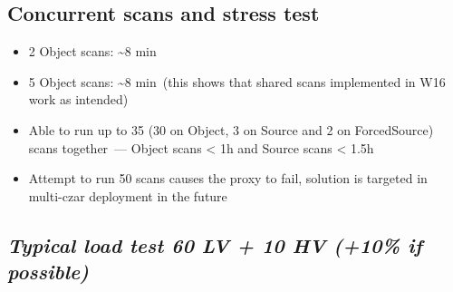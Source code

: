 \documentclass[DM,toc]{lsstdoc}
\begin{document}
\subsection{\texorpdfstring{\textbf{Concurrent scans and stress
test}}{Concurrent scans and stress test}}\label{concurrent-scans-and-stress-test}

\begin{itemize}
\item
  2 Object scans: \textasciitilde{}8 min
\item
  5 Object scans: \textasciitilde{}8 min~(this shows that shared scans
  implemented in W16 work as intended)
\item
  Able to run up to 35 (30 on Object, 3 on Source and 2 on ForcedSource)
  scans together~--- Object scans \textless{} 1h and Source scans
  \textless{} 1.5h
\item
  Attempt to run 50 scans causes the proxy to fail, solution is targeted
  in multi-czar deployment in the future
\end{itemize}

\subsection{\texorpdfstring{\textbf{\emph{Typical load test 60 LV +
10 HV (+10\% if
possible)}}}{Typical load test 60 LV + 10 HV (+10\% if possible)}}\label{typical-load-test-60-lv-10-hv-10-if-possible}
\end{document}
